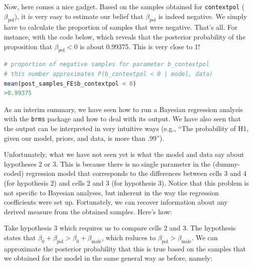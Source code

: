\documentclass[nobib]{tufte-handout}
\begin{document}
Now, here comes a nice gadget. Based on the samples obtained for \texttt{contextpol} ($\beta_{\text{pol}}$), it is very easy to estimate our belief that $\beta_{\text{pol}}$ is indeed negative. We simply have to calculate the proportion of samples that were negative. That's all. For instance, with the code below, which reveals that the posterior probability of the proposition that $\beta_{\text{pol}} < 0$ is about 0.99375. This is very close to 1!  

\begin{minipage}[]{\textwidth}
\begin{lstlisting}[language=R]
# proportion of negative samples for parameter b_contextpol
# this number approximates P(b_contextpol < 0 | model, data)
mean(post_samples_FE$b_contextpol < 0) 
>0.99375
\end{lstlisting}
\end{minipage}

\vspace{-0.5cm}

As an interim summary, we have seen how to run a Bayesian regression analysis with the
\texttt{brms} package and how to deal with its output. We have also seen that the output can be interpreted in very intuitive ways (e.g., ``The probability of H1, given our model, priors, and data, is more than .99'').

Unfortunately, what we have not seen yet is what the model and data say about hypotheses 2 or 3. This is because there is no single parameter in the (dummy-coded) regression model that corresponds to the differences between cells 3 and 4 (for hypothesis 2) and cells 2 and 3 (for hypothesis 3). Notice that this problem is not specific to Bayesian analyses, but inherent in the way the regression coefficients were set up.
%
%
Fortunately, we can recover information about any derived measure from the obtained samples. Here's how:

Take hypothesis 3 which requires us to compare cells 2 and 3. The hypothesis states that
$\beta_0 + \beta_{\text{pol}} > \beta_0 + \beta_{\text{male}}$, which reduces to
$\beta_{\text{pol}} > \beta_{\text{male}}$. We can approximate the posterior probability that
this is true based on the samples that we obtained for the model in the same general way as
before, namely:
\end{document}
